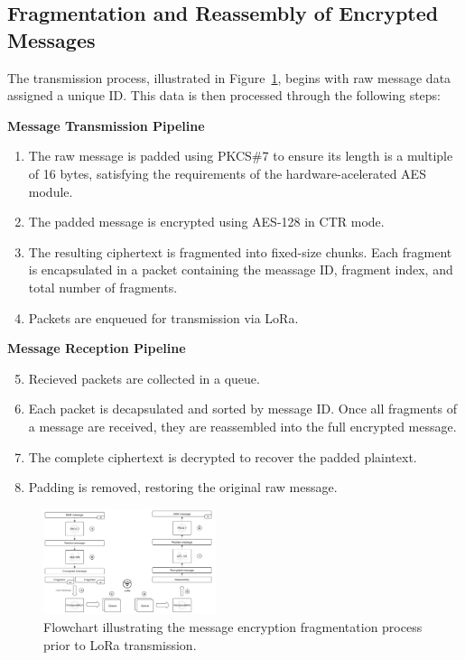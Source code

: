 \subsection{Fragmentation and Reassembly of Encrypted Messages}\label{sec:message-processing}

The transmission process, illustrated in Figure~\ref{fig:fragmentation-flow}, begins with raw message data assigned a unique ID. This data is then processed through the following steps:

\textbf{Message Transmission Pipeline}
\begin{enumerate}
  \item The raw message is padded using PKCS\#7 to ensure its length is a multiple of 16 bytes, satisfying the requirements of the hardware-acelerated AES module.
  \item The padded message is encrypted using AES-128 in CTR mode.
  \item The resulting ciphertext is fragmented into fixed-size chunks. Each fragment is encapsulated in a packet containing the meassage ID, fragment index, and total number of fragments.
  \item Packets are enqueued for transmission via LoRa.
\end{enumerate}

\textbf{Message Reception Pipeline}
\begin{enumerate}
  \setcounter{enumi}{4}
  \item Recieved packets are collected in a queue.
  \item Each packet is decapsulated and sorted by message ID. Once all fragments of a message are received, they are reassembled into the full encrypted message.
  \item The complete ciphertext is decrypted to recover the padded plaintext.
  \item Padding is removed, restoring the original raw message.
\end{enumerate}

\begin{figure}[H]
  \centering
  \includegraphics[width=0.45\textwidth]{images/packet-fragmentation-flow.png}
  \caption{Flowchart illustrating the message encryption fragmentation process prior to LoRa transmission.}
  \label{fig:fragmentation-flow}
\end{figure}

